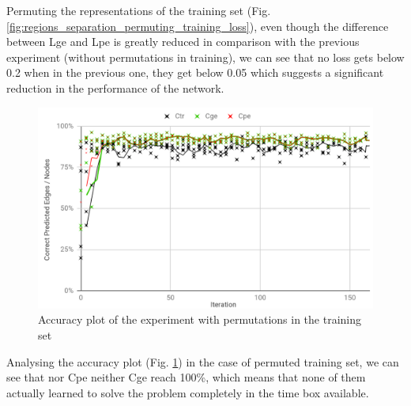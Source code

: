Permuting the representations of the training set (Fig. \ref{fig:regions_separation_permuting_training_loss}), even though the difference between Lge and Lpe is greatly reduced in comparison with the previous experiment (without permutations in training), we can see that no loss gets below 0.2 when in the previous one, they get below 0.05 which suggests a significant reduction in the performance of the network.

\begin{figure}[H]
    \centering
    \includegraphics[width=.9\linewidth]
    {fig/content/results/shapes/permuted_training/correct.png}
    \caption{Accuracy plot of the experiment with permutations in the training set}
    \label{fig:regions_separation_permuting_training_accuracy}
\end{figure}

Analysing the accuracy plot (Fig. \ref{fig:regions_separation_permuting_training_accuracy}) in the case of permuted training set, we can see that nor Cpe neither Cge reach 100\%, which means that none of them actually learned to solve the problem completely in the time box available. 



